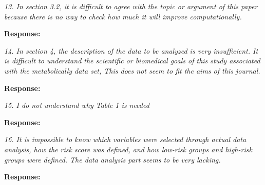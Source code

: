 \documentclass[11pt]{article}
\begin{document}
{\em 13. In section 3.2, it is difficult to agree with the topic or argument of this paper because there is no way to check how much it will improve computationally.}

\medskip

\textbf{Response:} 

\bigskip

{\em 14. In section 4, the description of the data to be analyzed is very insufficient. It is difficult to understand the scientific or biomedical goals of this study associated with the metabolically data set, This does not seem to fit the aims of this journal.}

\medskip

\textbf{Response:} 

\bigskip

{\em 15. I do not understand why Table 1 is needed}

\medskip

\textbf{Response:} 

\bigskip


{\em 16. It is impossible to know which variables were selected through actual data analysis, how the risk score was defined, and how low-risk groups and high-risk groups were defined. The data analysis part seems to be very lacking.}
\medskip

\textbf{Response:} 




\end{document}

